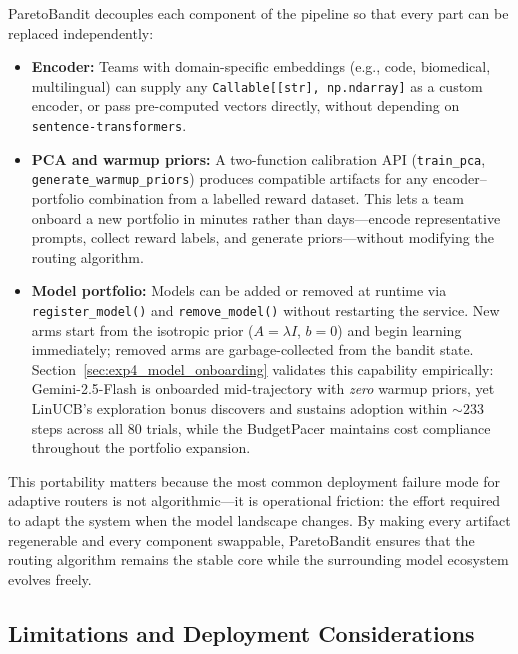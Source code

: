 ParetoBandit decouples each component of the pipeline so that every part can be replaced independently:
\begin{itemize}[nosep,leftmargin=*]
  \item \textbf{Encoder:} Teams with domain-specific embeddings (e.g., code, biomedical, multilingual) can supply any \texttt{Callable[[str], np.ndarray]} as a custom encoder, or pass pre-computed vectors directly, without depending on \texttt{sentence-transformers}.
  \item \textbf{PCA and warmup priors:} A two-function calibration API (\texttt{train\_pca}, \texttt{generate\_warmup\_priors}) produces compatible artifacts for any encoder--portfolio combination from a labelled reward dataset.  This lets a team onboard a new portfolio in minutes rather than days---encode representative prompts, collect reward labels, and generate priors---without modifying the routing algorithm.
  \item \textbf{Model portfolio:} Models can be added or removed at runtime via \texttt{register\_model()} and \texttt{remove\_model()} without restarting the service.  New arms start from the isotropic prior ($A{=}\lambda I$, $b{=}0$) and begin learning immediately; removed arms are garbage-collected from the bandit state.  Section~\ref{sec:exp4_model_onboarding} validates this capability empirically: Gemini-2.5-Flash is onboarded mid-trajectory with \emph{zero} warmup priors, yet LinUCB's exploration bonus discovers and sustains adoption within ${\sim}233$ steps across all 80 trials, while the BudgetPacer maintains cost compliance throughout the portfolio expansion.
\end{itemize}
This portability matters because the most common deployment failure mode for adaptive routers is not algorithmic---it is operational friction: the effort required to adapt the system when the model landscape changes.  By making every artifact regenerable and every component swappable, ParetoBandit ensures that the routing algorithm remains the stable core while the surrounding model ecosystem evolves freely.

\subsection{Limitations and Deployment Considerations}

